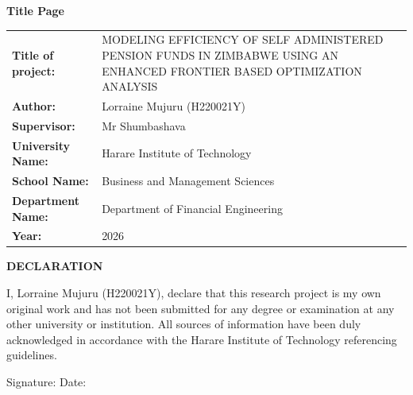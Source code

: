 \documentclass[12pt,a4paper]{article}
\begin{document}
{\fontsize{14}{17}\selectfont
\begin{center}
\vspace*{1cm}
\textbf{Title Page}
\end{center}

\vspace{1.5cm}

\noindent\begin{tabular}{@{}p{4.5cm}p{10cm}@{}}
\textbf{Title of project:} & {\setstretch{1.0}MODELING EFFICIENCY OF SELF ADMINISTERED PENSION FUNDS IN ZIMBABWE USING AN ENHANCED FRONTIER BASED OPTIMIZATION ANALYSIS} \\[1cm]
\textbf{Author:}           & Lorraine Mujuru (H220021Y) \\[1cm]
\textbf{Supervisor:}       & Mr Shumbashava \\[1cm]
\textbf{University Name:}  & Harare Institute of Technology \\[1cm]
\textbf{School Name:}      & Business and Management Sciences \\[1cm]
\textbf{Department Name:}  & Department of Financial Engineering \\[1cm]
\textbf{Year:}             & 2026 \\
\end{tabular}
}
\newpage

\begin{center}
    {\LARGE\bfseries DECLARATION}
\end{center}
\vspace{1cm}

I, Lorraine Mujuru (H220021Y), declare that this research project is my own original work and has not been submitted for any degree or examination at any other university or institution. All sources of information have been duly acknowledged in accordance with the Harare Institute of Technology referencing guidelines.

\vspace{2.5cm}

\noindent Signature: \underline{\hspace{6cm}} \hfill Date: \underline{\hspace{3.5cm}}

\vspace{1cm}
\end{document}
